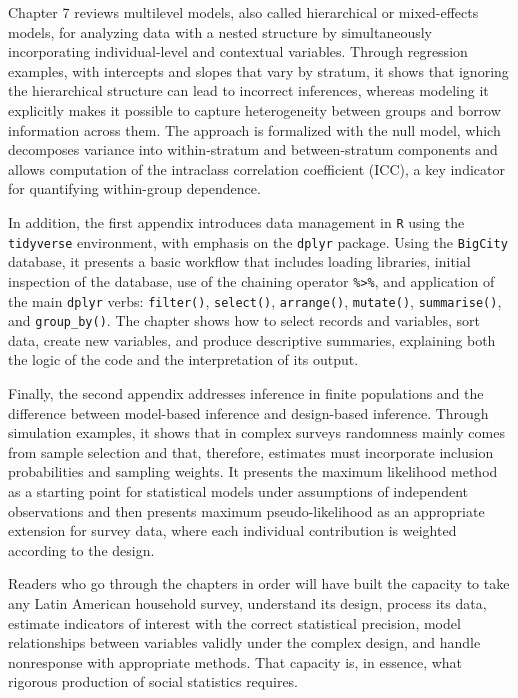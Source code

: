 \documentclass[
  english,
  12pt,
]{book}
\begin{document}
Chapter 7 reviews multilevel models, also called hierarchical or mixed-effects models, for analyzing data with a nested structure by simultaneously incorporating individual-level and contextual variables. Through regression examples, with intercepts and slopes that vary by stratum, it shows that ignoring the hierarchical structure can lead to incorrect inferences, whereas modeling it explicitly makes it possible to capture heterogeneity between groups and borrow information across them. The approach is formalized with the null model, which decomposes variance into within-stratum and between-stratum components and allows computation of the intraclass correlation coefficient (ICC), a key indicator for quantifying within-group dependence.

In addition, the first appendix introduces data management in \texttt{R} using the \texttt{tidyverse} environment, with emphasis on the \texttt{dplyr} package. Using the \texttt{BigCity} database, it presents a basic workflow that includes loading libraries, initial inspection of the database, use of the chaining operator \texttt{\%\textgreater{}\%}, and application of the main \texttt{dplyr} verbs: \texttt{filter()}, \texttt{select()}, \texttt{arrange()}, \texttt{mutate()}, \texttt{summarise()}, and \texttt{group\_by()}. The chapter shows how to select records and variables, sort data, create new variables, and produce descriptive summaries, explaining both the logic of the code and the interpretation of its output.

Finally, the second appendix addresses inference in finite populations and the difference between model-based inference and design-based inference. Through simulation examples, it shows that in complex surveys randomness mainly comes from sample selection and that, therefore, estimates must incorporate inclusion probabilities and sampling weights. It presents the maximum likelihood method as a starting point for statistical models under assumptions of independent observations and then presents maximum pseudo-likelihood as an appropriate extension for survey data, where each individual contribution is weighted according to the design.

Readers who go through the chapters in order will have built the capacity to take any Latin American household survey, understand its design, process its data, estimate indicators of interest with the correct statistical precision, model relationships between variables validly under the complex design, and handle nonresponse with appropriate methods. That capacity is, in essence, what rigorous production of social statistics requires.
\end{document}

